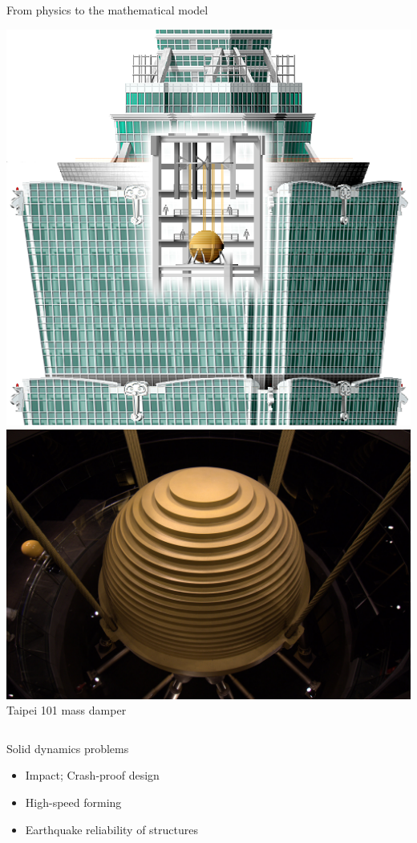 \begin{frame}{From physics to the mathematical model}
\begin{overprint}
    \centering
    \includegraphics[scale=0.15]{section1/pictures/TaipeiTower.png} \quad
    \includegraphics[scale=0.08]{section1/pictures/MassDamper.jpg}\\
    \scriptsize Taipei 101 mass damper

    \begin{columns}
      \begin{column}{0.45\textwidth}
        \begin{block}{Solid dynamics problems}
          \begin{itemize}
          \item[] Impact; Crash-proof design
          \item[] High-speed forming
          \item[] Earthquake reliability of structures 
          \end{itemize}
        \end{block}
      \end{column}
      

\end{columns}
\end{overprint}
\end{frame}
